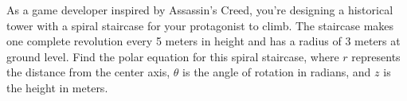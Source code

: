 \documentclass[border=10pt]{standalone}
\begin{document}
\begin{tcolorbox}[
    enhanced,
    colback=custompink!30,
    colframe=customblue,
    boxrule=1pt,
    arc=10pt,
    fontupper=\sffamily\large,
    drop fuzzy shadow=customblue
]
As a game developer inspired by Assassin's Creed, you're designing a historical tower with a spiral staircase for your protagonist to climb. The staircase makes one complete revolution every 5 meters in height and has a radius of 3 meters at ground level. Find the polar equation for this spiral staircase, where $r$ represents the distance from the center axis, $\theta$ is the angle of rotation in radians, and $z$ is the height in meters.
\end{tcolorbox}
\end{document}
